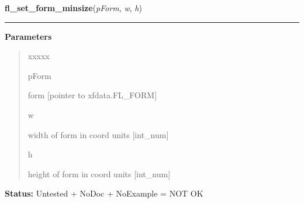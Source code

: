 \hspace{.8\funcindent}\begin{boxedminipage}{\funcwidth}

    \raggedright \textbf{fl\_set\_form\_minsize}(\textit{pForm}, \textit{w}, \textit{h})

    \vspace{-1.5ex}

    \rule{\textwidth}{0.5\fboxrule}
\setlength{\parskip}{2ex}
\setlength{\parskip}{1ex}
      \textbf{Parameters}
      \vspace{-1ex}

      \begin{quote}
        \begin{Ventry}{xxxxx}

          \item[pForm]

          form [pointer to xfdata.FL\_FORM]

          \item[w]

          width of form in coord units [int\_num]

          \item[h]

          height of form in coord units [int\_num]

        \end{Ventry}

      \end{quote}

\textbf{Status:} Untested + NoDoc + NoExample = NOT OK



    \end{boxedminipage}

    \label{xformslib:library:fl_set_form_maxsize}

    \vspace{0.5ex}

